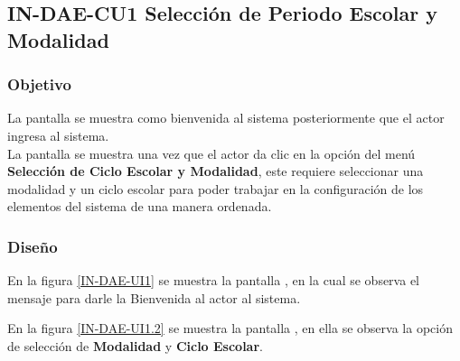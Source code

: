 \subsection{IN-DAE-CU1 Selección de Periodo Escolar y Modalidad}

\subsubsection{Objetivo}
	
	La pantalla  se muestra como bienvenida al sistema posteriormente que el actor ingresa al sistema.\\
	
	
	La pantalla   se muestra una vez que el actor da clic en la opción del menú \textbf{Selección de Ciclo Escolar y Modalidad}, este requiere seleccionar una modalidad y un ciclo escolar para poder trabajar en la configuración de los elementos del sistema de una manera ordenada.

\subsubsection{Diseño}


   

    En la figura \ref{IN-DAE-UI1} se muestra la pantalla , en la cual se observa el mensaje  para darle la Bienvenida al actor al sistema.
    
      En la figura \ref{IN-DAE-UI1.2} se muestra la pantalla , en ella se observa la opción de selección de \textbf{Modalidad} y \textbf{Ciclo Escolar}.
    
   
    
    
